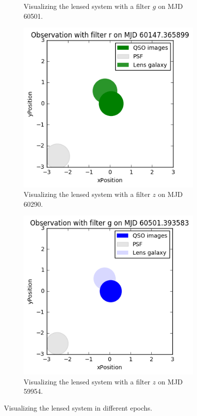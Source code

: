 \documentclass[\docopts]{\docclass}
\begin{document}
\begin{figure}
\begin{subfigure}[b]{0.2\textwidth}
        \caption{Visualizing the lensed system with a filter $g$ on MJD 60501.}
        \label{fig:vis_lens_b}
    \end{subfigure}
    \begin{subfigure}[b]{0.2\textwidth}
        \includegraphics[width=\textwidth]{plot-c.png}
        \caption{Visualizing the lensed system with a filter $z$ on MJD 60290.}
        \label{fig:vis_lens_c}
    \end{subfigure}
    \begin{subfigure}[b]{0.2\textwidth}
        \includegraphics[width=\textwidth]{plot-d.png}
        \caption{Visualizing the lensed system with a filter $z$ on MJD 59954.}
        \label{fig:vis_lens_d}
    \end{subfigure}
    \caption{Visualizing the lensed system in different epochs.}
    \label{fig:visualization}
\end{figure}
\end{document}
